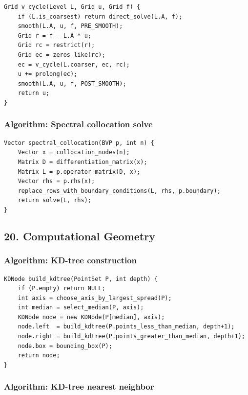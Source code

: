 \documentclass[11pt]{article}
\begin{document}
\begin{verbatim}
Grid v_cycle(Level L, Grid u, Grid f) {
    if (L.is_coarsest) return direct_solve(L.A, f);
    smooth(L.A, u, f, PRE_SMOOTH);
    Grid r = f - L.A * u;
    Grid rc = restrict(r);
    Grid ec = zeros_like(rc);
    ec = v_cycle(L.coarser, ec, rc);
    u += prolong(ec);
    smooth(L.A, u, f, POST_SMOOTH);
    return u;
}
\end{verbatim}

\subsubsection{Algorithm: Spectral collocation solve}\label{algorithm-spectral-collocation-solve}

\begin{verbatim}
Vector spectral_collocation(BVP p, int n) {
    Vector x = collocation_nodes(n);
    Matrix D = differentiation_matrix(x);
    Matrix L = p.operator_matrix(D, x);
    Vector rhs = p.rhs(x);
    replace_rows_with_boundary_conditions(L, rhs, p.boundary);
    return solve(L, rhs);
}
\end{verbatim}

\subsection{20. Computational Geometry}\label{computational-geometry}

\subsubsection{Algorithm: KD-tree construction}\label{algorithm-kd-tree-construction}

\begin{verbatim}
KDNode build_kdtree(PointSet P, int depth) {
    if (P.empty) return NULL;
    int axis = choose_axis_by_largest_spread(P);
    int median = select_median(P, axis);
    KDNode node = new KDNode(P[median], axis);
    node.left  = build_kdtree(P.points_less_than_median, depth+1);
    node.right = build_kdtree(P.points_greater_than_median, depth+1);
    node.box = bounding_box(P);
    return node;
}
\end{verbatim}

\subsubsection{Algorithm: KD-tree nearest neighbor}\label{algorithm-kd-tree-nearest-neighbor}
\end{document}
